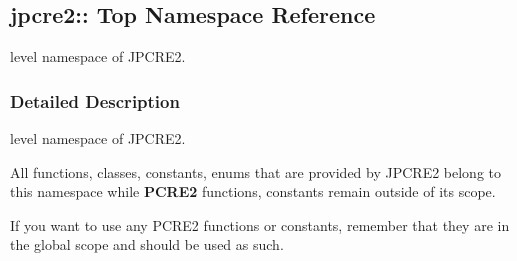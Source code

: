 \hypertarget{namespacejpcre2_1_1
Top}{}\subsection{jpcre2\+:\+: Top Namespace Reference}
\label{namespacejpcre2_1_1
Top}


level namespace of J\+P\+C\+R\+E2.  




\subsubsection{Detailed Description}
level namespace of J\+P\+C\+R\+E2. 

All functions, classes, constants, enums that are provided by J\+P\+C\+R\+E2 belong to this namespace while {\bfseries P\+C\+R\+E2} functions, constants remain outside of its scope.

If you want to use any P\+C\+R\+E2 functions or constants, remember that they are in the global scope and should be used as such. 
